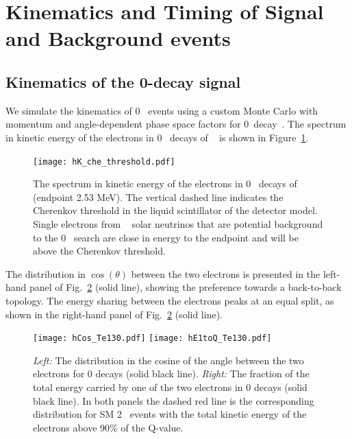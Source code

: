 \section{Kinematics and Timing of Signal and Background events}
\label{sec:kinematics_and_timing}

\subsection{Kinematics of the 0\nbb-decay signal}

We simulate the kinematics of 0\nbb~ events using a custom Monte
Carlo with momentum and angle-dependent phase space
factors for 0\nbb~decay~\cite{Jenni}.  The spectrum in kinetic energy
of the electrons in 0\nbb~ decays of \Te~ is shown in
Figure~\ref{fig:Energy_spectrum}.

\begin{figure}[ht]
  \centering
  \texttt{[image: hK\_che\_threshold.pdf]}
  \caption{The spectrum in kinetic energy of the electrons in 0\nbb~
  decays of \Te~ (endpoint 2.53 MeV). The vertical dashed line
  indicates the Cherenkov threshold in the liquid scintillator of the
  detector model. Single electrons from \B~ solar neutrinos that are
  potential background to the 0\nbb~ search are close in energy to the
  endpoint and will be above the Cherenkov threshold.}
 \label{fig:Energy_spectrum}
\end{figure}


The distribution in
$\cos{(\theta)}$ between the two electrons is presented in the left-hand
panel of Fig.~\ref{fig:Kinematics} (solid line), showing the
preference towards a back-to-back topology.  The energy sharing between
the electrons peaks at an equal split, as shown in the right-hand
panel of Fig.~\ref{fig:Kinematics} (solid line).

\begin{figure}[ht]
  \centering
  \texttt{[image: hCos\_Te130.pdf]}
  \texttt{[image: hE1toQ\_Te130.pdf]}
  \caption{\emph{Left:} The distribution in the cosine of the angle
      between the two electrons for 0{\nbb} decays (solid black line).
      \emph{Right:} The fraction of the total energy carried by one of
      the two electrons in 0{\nbb} decays (solid black line).  In both
      panels the dashed red line is the corresponding distribution for
      SM 2\nbb~ events with the total kinetic energy of the electrons
      above 90\% of the Q-value.}
  \label{fig:Kinematics}
\end{figure}


